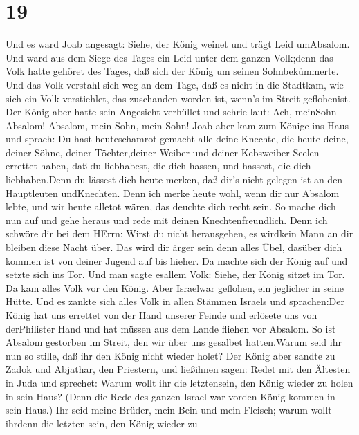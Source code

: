 \hypertarget{section-18}{%
\section{19}\label{section-18}}

 Und es ward Joab angesagt: Siehe, der König weinet und
trägt Leid umAbsalom.  Und ward aus dem Siege des Tages ein
Leid unter dem ganzen Volk;denn das Volk hatte gehöret des Tages, daß
sich der König um seinen Sohnbekümmerte.  Und das Volk
verstahl sich weg an dem Tage, daß es nicht in die Stadtkam, wie sich
ein Volk verstiehlet, das zuschanden worden ist, wenn's im Streit
geflohenist.  Der König aber hatte sein Angesicht verhüllet
und schrie laut: Ach, meinSohn Absalom! Absalom, mein Sohn, mein Sohn!
 Joab aber kam zum Könige ins Haus und sprach: Du hast
heuteschamrot gemacht alle deine Knechte, die heute deine, deiner Söhne,
deiner Töchter,deiner Weiber und deiner Kebsweiber Seelen errettet
haben,  daß du liebhabest, die dich hassen, und hassest, die
dich liebhaben.Denn du lässest dich heute merken, daß dir's nicht
gelegen ist an den Hauptleuten undKnechten. Denn ich merke heute wohl,
wenn dir nur Absalom lebte, und wir heute alletot wären, das deuchte
dich recht sein.  So mache dich nun auf und gehe heraus und
rede mit deinen Knechtenfreundlich. Denn ich schwöre dir bei dem HErrn:
Wirst du nicht herausgehen, es wirdkein Mann an dir bleiben diese Nacht
über. Das wird dir ärger sein denn alles Übel, dasüber dich kommen ist
von deiner Jugend auf bis hieher.  Da machte sich der König
auf und setzte sich ins Tor. Und man sagte esallem Volk: Siehe, der
König sitzet im Tor. Da kam alles Volk vor den König. Aber Israelwar
geflohen, ein jeglicher in seine Hütte.  Und es zankte sich
alles Volk in allen Stämmen Israels und sprachen:Der König hat uns
errettet von der Hand unserer Feinde und erlösete uns von derPhilister
Hand und hat müssen aus dem Lande fliehen vor Absalom.  So
ist Absalom gestorben im Streit, den wir über uns gesalbet hatten.Warum
seid ihr nun so stille, daß ihr den König nicht wieder holet?
 Der König aber sandte zu Zadok und Abjathar, den
Priestern, und ließihnen sagen: Redet mit den Ältesten in Juda und
sprechet: Warum wollt ihr die letztensein, den König wieder zu holen in
sein Haus? (Denn die Rede des ganzen Israel war vorden König kommen in
sein Haus.)  Ihr seid meine Brüder, mein Bein und mein
Fleisch; warum wollt ihrdenn die letzten sein, den König wieder zu
